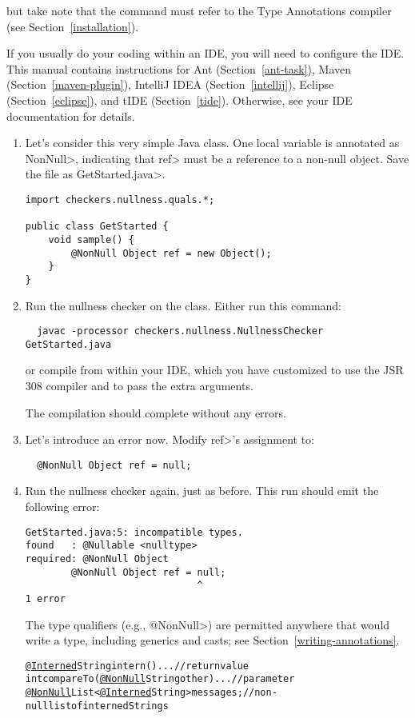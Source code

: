 \noindent
but take note that the  command must refer to the Type
Annotations compiler (see Section~\ref{installation}).


If you usually do your coding within an IDE, you will need to configure
the IDE.  This manual contains instructions for
Ant (Section~\ref{ant-task}),
Maven (Section~\ref{maven-plugin}),
IntelliJ IDEA (Section~\ref{intellij}),
Eclipse (Section~\ref{eclipse}), and
tIDE (Section~\ref{tide}).
Otherwise, see your IDE documentation for details.


\begin{enumerate}
\item
  Let's consider this very simple Java class.  One local variable is
  annotated as \<NonNull>, indicating that \<ref> must be a reference to a
  non-null object.  Save the file as \<GetStarted.java>.

\begin{Verbatim}
import checkers.nullness.quals.*;

public class GetStarted {
    void sample() {
        @NonNull Object ref = new Object();
    }
}
\end{Verbatim}

\item
  Run the nullness checker on the class.
  Either run this command:
\begin{Verbatim}
  javac -processor checkers.nullness.NullnessChecker GetStarted.java
\end{Verbatim}

\noindent
or compile from within your IDE, which you have customized to use the JSR
308 compiler and to pass the extra arguments.

  The compilation should complete without any errors.

\item
  Let's introduce an error now.  Modify \<ref>'s assignment to:
\begin{Verbatim}
  @NonNull Object ref = null;
\end{Verbatim}

\item
  Run the nullness checker again, just as before.  This run should emit
  the following error:
\begin{Verbatim}
GetStarted.java:5: incompatible types.
found   : @Nullable <nulltype>
required: @NonNull Object
        @NonNull Object ref = null;
                              ^
1 error
\end{Verbatim}

The type qualifiers (e.g., \<@NonNull>) are permitted anywhere
that would write a type, including generics and casts; see
Section~\ref{writing-annotations}.

\begin{alltt}
  \underline{@Interned} String intern() \ttlcb{} ... \ttrcb{}             // return value
  int compareTo(\underline{@NonNull} String other) \ttlcb{} ... \ttrcb{}  // parameter
  \underline{@NonNull} List<\underline{@Interned} String> messages;     // non-null list of interned Strings
\end{alltt}

\end{enumerate}


